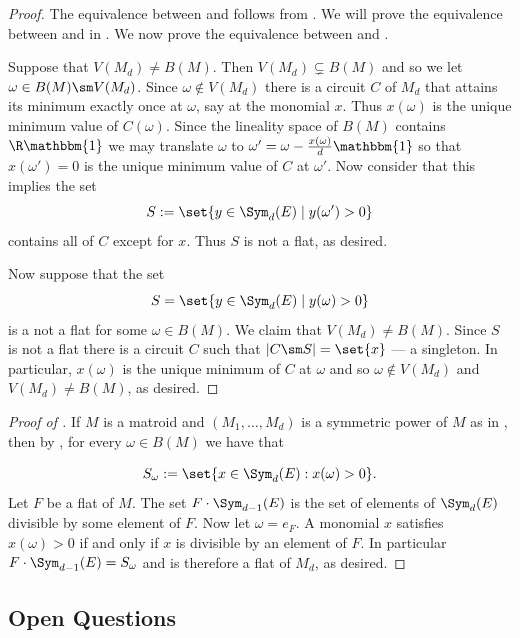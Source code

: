 \begin{proof} The equivalence between 
and  follows from . We will prove the equivalence between  and  in . We now prove the equivalence between  and .

Suppose that $V(M_d)\neq B(M)$. Then $V(M_d)\subsetneq B(M)$ and so we let $\omega\in B(M)\sm V(M_d)$. Since $\omega\notin V(M_d)$ there is a circuit $C$ of $M_d$ that attains its minimum exactly once at $\omega$, say at the monomial $x$. Thus $x(\omega)$ is the unique minimum value of $C(\omega)$. Since the lineality space of $B(M)$ contains $\R\mathbbm{1}$ we may translate $\omega$ to $\omega' = \omega- \frac{x(\omega)}{d} \mathbbm{1}$ so that $x(\omega')=0$ is the unique minimum value of $C$ at $\omega'$. Now consider that this implies the set
$$S:=\set{y\in \Sym_d(E)\mid y(\omega')>0}$$
contains all of $C$ except for $x$. Thus $S$ is not a flat, as desired.

Now suppose that the set 
$$S = \set{y\in \Sym_d(E)\mid y(\omega)>0}$$
is a not a flat for some $\omega\in B(M)$. We claim that $V(M_d)\neq B(M)$. Since $S$ is not a flat there is a circuit $C$ such that $|C\sm S|=\set{x}$ --- a singleton. In particular, $x(\omega)$ is the unique minimum of $C$ at $\omega$ and so $\omega\notin V(M_d)$ and $V(M_d)\neq B(M)$, as desired.
\end{proof}

\begin{proof}[Proof of ]
If $M$ is a matroid and $(M_1,\dots,M_d)$ is a symmetric power of $M$ as in , then by , for every $\omega\in B(M)$ we have that

$$S_\omega:= \set{x\in \Sym_d(E): x(\omega)>0}.$$
Let $F$ be a flat of $M$. The set $F\cdot \Sym_{d-1}(E)$ is the set of elements of $\Sym_d(E)$ divisible by some element of $F$. Now let $\omega= e_F$. A monomial $x$ satisfies $x(\omega)>0$ if and only if $x$ is divisible by an element of $F$. In particular $F\cdot\Sym_{d-1}(E)=S_\omega$ and is therefore a flat of $M_d$, as desired.
\end{proof}

\subsection{Open Questions}\label{subsec:openQuestions}

